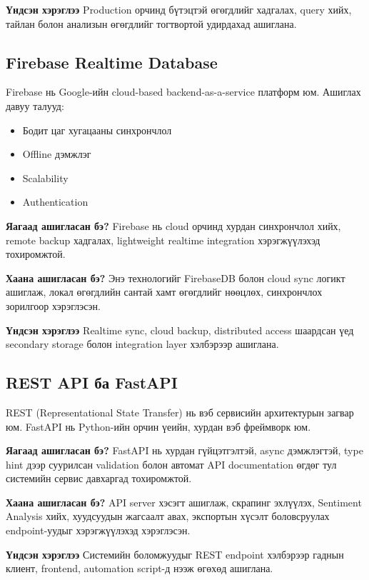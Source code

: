 \documentclass[12pt,a4paper]{report}
\begin{document}
\textbf{Үндсэн хэрэглээ} Production орчинд бүтэцтэй өгөгдлийг хадгалах, query хийх, тайлан болон анализын өгөгдлийг тогтвортой удирдахад ашиглана.

\subsection{Firebase Realtime Database}

Firebase нь Google-ийн cloud-based backend-as-a-service платформ юм. Ашиглах давуу талууд:

\begin{itemize}
    \item Бодит цаг хугацааны синхрончлол
    \item Offline дэмжлэг
    \item Scalability
    \item Authentication
\end{itemize}

\textbf{Яагаад ашигласан бэ?} Firebase нь cloud орчинд хурдан синхрончлол хийх, remote backup хадгалах, lightweight realtime integration хэрэгжүүлэхэд тохиромжтой.

\textbf{Хаана ашигласан бэ?} Энэ технологийг FirebaseDB болон cloud sync логикт ашиглаж, локал өгөгдлийн сантай хамт өгөгдлийг нөөцлөх, синхрончлох зорилгоор хэрэглэсэн.

\textbf{Үндсэн хэрэглээ} Realtime sync, cloud backup, distributed access шаардсан үед secondary storage болон integration layer хэлбэрээр ашиглана.

\subsection{REST API ба FastAPI}

REST (Representational State Transfer) нь вэб сервисийн архитектурын загвар юм. FastAPI нь Python-ийн орчин үеийн, хурдан вэб фреймворк юм.


\textbf{Яагаад ашигласан бэ?} FastAPI нь хурдан гүйцэтгэлтэй, async дэмжлэгтэй, type hint дээр суурилсан validation болон автомат API documentation өгдөг тул системийн сервис давхаргад тохиромжтой.

\textbf{Хаана ашигласан бэ?} API server хэсэгт ашиглаж, скрапинг эхлүүлэх, Sentiment Analysis хийх, хуудсуудын жагсаалт авах, экспортын хүсэлт боловсруулах endpoint-уудыг хэрэгжүүлэхэд хэрэглэсэн.

\textbf{Үндсэн хэрэглээ} Системийн боломжуудыг REST endpoint хэлбэрээр гаднын клиент, frontend, automation script-д нээж өгөхөд ашиглана.
\end{document}
